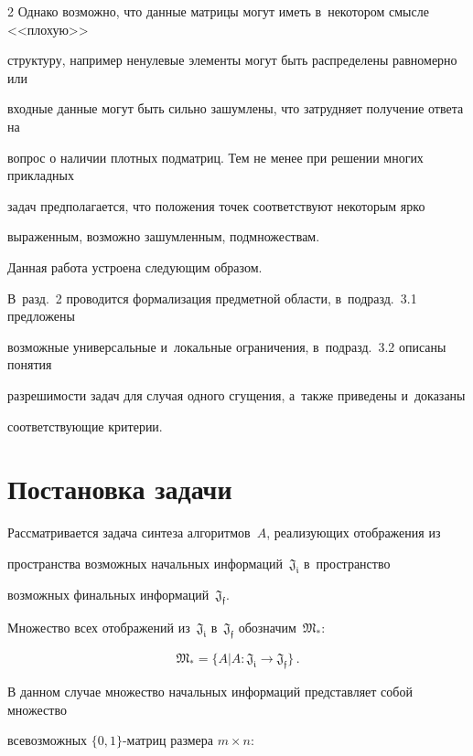 \begin{multicols}{2}
Однако возможно, что данные матрицы могут иметь в~некотором смысле <<плохую>> 


структуру, например ненулевые элементы могут быть распределены равномерно или 


входные данные могут быть сильно зашумлены, что затрудняет получение ответа на 


вопрос о наличии плотных подматриц. Тем не менее при решении многих прикладных 


задач предполагается, что положения точек соответствуют некоторым ярко 


выраженным, возможно зашумленным, подмножествам.





Данная работа устроена следующим образом.


В~разд.~2 проводится формализация предметной области, в~подразд.~3.1 предложены 


возможные универсальные и~локальные ограничения, в~подразд.~3.2 описаны понятия 


разрешимости задач для случая одного сгущения, а~также приведены и~доказаны 


соответствующие критерии.





\section{Постановка задачи}





Рассматривается задача синтеза алгоритмов~$A$, реализующих отображения из 


пространства возможных начальных информаций~$\mathfrak{J_i}$ в~пространство 


возможных финальных информаций~$\mathfrak{J_f}$.


Множество всех отображений из~$\mathfrak{J_i}$ в~$\mathfrak{J_f}$ обозначим~$\mathfrak{M_*}$:


$$


\mathfrak{M_*} = \{A|A:\mathfrak{J_i} \rightarrow \mathfrak{J_f}\}\,.


$$





В данном случае множество начальных информаций представляет собой множество 


всевозможных $\{0,1\}$-мат\-риц размера $m \times n$:



\end{multicols}
